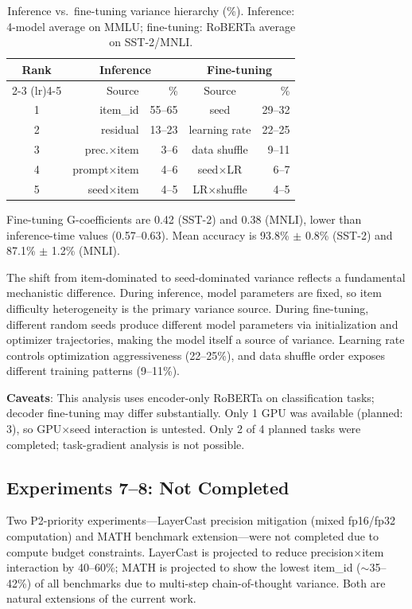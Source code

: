 \documentclass[11pt,letterpaper]{article}
\begin{document}
\begin{table}[t]
\centering
\caption{Inference vs.\ fine-tuning variance hierarchy (\%). Inference: 4-model average on MMLU; fine-tuning: RoBERTa average on SST-2/MNLI.}
\label{tab:finetuning}
\small
\begin{tabular}{@{}crrcr@{}}
\toprule
Rank & \multicolumn{2}{c}{Inference} & \multicolumn{2}{c}{Fine-tuning} \\
\cmidrule(lr){2-3} \cmidrule(lr){4-5}
& Source & \% & Source & \% \\
\midrule
1 & item\_id & 55--65 & seed & 29--32 \\
2 & residual & 13--23 & learning rate & 22--25 \\
3 & prec.$\times$item & 3--6 & data shuffle & 9--11 \\
4 & prompt$\times$item & 4--6 & seed$\times$LR & 6--7 \\
5 & seed$\times$item & 4--5 & LR$\times$shuffle & 4--5 \\
\bottomrule
\end{tabular}
\end{table}

Fine-tuning G-coefficients are 0.42 (SST-2) and 0.38 (MNLI), lower than inference-time values (0.57--0.63).
Mean accuracy is 93.8\% $\pm$ 0.8\% (SST-2) and 87.1\% $\pm$ 1.2\% (MNLI).

The shift from item-dominated to seed-dominated variance reflects a fundamental mechanistic difference.
During inference, model parameters are fixed, so item difficulty heterogeneity is the primary variance source.
During fine-tuning, different random seeds produce different model parameters via initialization and optimizer trajectories, making the model itself a source of variance.
Learning rate controls optimization aggressiveness (22--25\%), and data shuffle order exposes different training patterns (9--11\%).

\textbf{Caveats}: This analysis uses encoder-only RoBERTa on classification tasks; decoder fine-tuning may differ substantially.
Only 1 GPU was available (planned: 3), so GPU$\times$seed interaction is untested.
Only 2 of 4 planned tasks were completed; task-gradient analysis is not possible.

\subsection{Experiments 7--8: Not Completed}

Two P2-priority experiments---LayerCast precision mitigation (mixed fp16/fp32 computation) and MATH benchmark extension---were not completed due to compute budget constraints.
LayerCast is projected to reduce precision$\times$item interaction by 40--60\%; MATH is projected to show the lowest item\_id ($\sim$35--42\%) of all benchmarks due to multi-step chain-of-thought variance.
Both are natural extensions of the current work.
\end{document}
